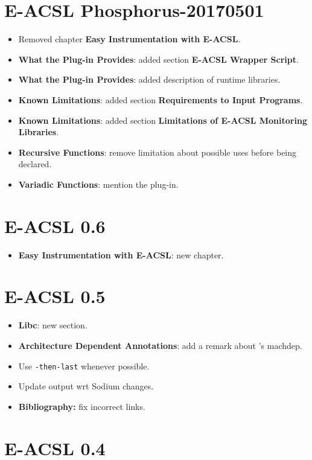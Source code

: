 \section*{E-ACSL Phosphorus-20170501}

\begin{itemize}
\item Removed chapter \textbf{Easy Instrumentation with E-ACSL}.
\item \textbf{What the Plug-in Provides}: added section \textbf{E-ACSL Wrapper
  Script}.
\item \textbf{What the Plug-in Provides}: added description of \eacsl runtime
  libraries.
\item \textbf{Known Limitations}: added section \textbf{Requirements to Input
  Programs}.
\item \textbf{Known Limitations}: added section \textbf{Limitations of E-ACSL Monitoring Libraries}.
\item \textbf{Recursive Functions}: remove limitation about possible uses before
  being declared.
\item \textbf{Variadic Functions}: mention the \variadic plug-in.
\end{itemize}

\section*{E-ACSL 0.6}

\begin{itemize}
\item \textbf{Easy Instrumentation with E-ACSL}: new chapter.
\end{itemize}

\section*{E-ACSL 0.5}

\begin{itemize}
\item \textbf{Libc}: new section.
\item \textbf{Architecture Dependent Annotations}: add a remark about \gcc's
  machdep.
\item Use \texttt{-then-last} whenever possible.
\item Update output wrt \framac Sodium changes.
\item \textbf{Bibliography:} fix incorrect links.
\end{itemize}

\section*{E-ACSL 0.4}


